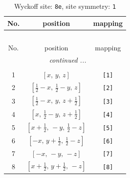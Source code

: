 \documentclass[fleqn,8pt]{jsarticle}
\begin{document}
\renewcommand{\arraystretch}{1.2}
\begin{longtable}{ccc}
\caption{Wyckoff site: {\tt 8e}, site symmetry: {\tt 1}}
 \\
 \hline \hline
No. & position & mapping \\ \hline \endfirsthead

\multicolumn{2}{l}{\tablename\ \thetable{}} \\
 \hline \hline
No. & position & mapping \\ \hline \endhead

 \hline \hline
\multicolumn{2}{r}{\footnotesize\it continued ...} \\ \endfoot

 \hline \hline
\multicolumn{2}{r}{} \\ \endlastfoot

1 & $\left[ x,\, y,\, z \right]$ & {\tt [1]} \\ \hline
2 & $\left[ \frac{1}{2} - x,\, \frac{1}{2} - y,\, z \right]$ & {\tt [2]} \\ \hline
3 & $\left[ \frac{1}{2} - x,\, y,\, z + \frac{1}{2} \right]$ & {\tt [3]} \\ \hline
4 & $\left[ x,\, \frac{1}{2} - y,\, z + \frac{1}{2} \right]$ & {\tt [4]} \\ \hline
5 & $\left[ x + \frac{1}{2},\, - y,\, \frac{1}{2} - z \right]$ & {\tt [5]} \\ \hline
6 & $\left[ - x,\, y + \frac{1}{2},\, \frac{1}{2} - z \right]$ & {\tt [6]} \\ \hline
7 & $\left[ - x,\, - y,\, - z \right]$ & {\tt [7]} \\ \hline
8 & $\left[ x + \frac{1}{2},\, y + \frac{1}{2},\, - z \right]$ & {\tt [8]} \\
\end{longtable}
\end{document}
